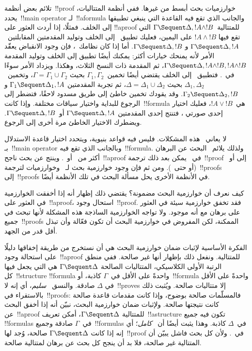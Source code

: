 \documentclass[../../../include/open-logic-section]{subfiles}
\begin{document}
تلائم بعض أنظمة~!!{proof} خوارزميات بحث أبسط من غيرها. ففي أنظمة
المتتاليات، يحدد~!!{main operator} لـ~!!a{formula} والجانب الذي تقع فيه
القاعدة التي ينبغي تطبيقها إلى الخلف. فمثلًا، إذا أردت العثور على
!!a{proof} للمتتالية~$\Gamma \Sequent \Delta,!A\land !B$ التي تقع فيها
$!A\land !B$ على اليمين، فعليك تطبيق~\RightR{\land} إلى الخلف وتوليد
المقدمتين المقابلتين~$\Gamma \Sequent \Delta,!A$ و
$\Gamma \Sequent \Delta,!B$. أما إذا كان نظامك~، فإن وجود
الانقباض يعقّد الأمر لأنه يمنحك خيارات أكثر: يمكنك أيضًا تطبيق
\RightR{\Contraction} إلى الخلف وتوليد المقدمة
$\Gamma \Sequent \Delta,!A\land !B,!A\land !B$، ثم المقدمة ذات النسخ
الثلاث، وهكذا. ويزداد الأمر سوءًا في~. فتطبيق~\RightR{\land} إلى
الخلف يقتضي أيضًا تخمين~$\Gamma_1,\Gamma_2$ بحيث
$\Gamma=\Gamma_1\cup\Gamma_2$، وتخمين~$\Delta_1,\Delta_2$ بحيث
$\Delta=\Delta_1\cup\Delta_2$، ثم تجربة المقدمتين
$\Gamma_1\Sequent\Delta_1,!A$ و$\Gamma_2\Sequent\Delta_2,!B$. وقد يقودك
تخمين خاطئ إلى طريق مسدود لاحقًا، فتضطر إلى الرجوع للبداية واختيار سياقات
مختلفة. وإذا كانت~!!{formula} هي~$!A\lor !B$، فعليك اختيار إحدى صورتي
\RightR{\lor}، فتنتج إحدى المقدمتين
$\Gamma\Sequent\Delta,!A$ أو~$\Gamma\Sequent\Delta,!B$. ويضطرك الاختيار
الخاطئ مرة أخرى إلى الرجوع.

لا يعاني~ هذه المشكلات. فليس فيه قواعد بنيوية، ويتحدد اختيار قاعدة
الاستدلال بـ~!!{main operator} وبالجانب الذي تقع فيه~!!{formula}. ولذلك
يلائم~ البحث عن البرهان أكثر من~ أو~. وينتج عن
بحث ناجح~!!a{proof} في~ يمكن بعد ذلك ترجمة~!!{proof} إلى
 أو~ (أو حتى~). ومن ثم فإن وجود خوارزمية بحث
لـ~ وخوارزميات لترجمة~!!{proof}s~ إلى~!!{proof}s في
الأنظمة الأخرى يحل مسألة البحث في تلك الأنظمة أيضًا.

كيف نعرف أن خوارزمية البحث مضمونة؟ يقتضي ذلك إظهار أنه إذا أخفقت الخوارزمية
في العثور على~!!a{proof}، استحال وجود~!!{proof}. فقد تخفق خوارزمية سيئة في
العثور على برهان مع أنه موجود. ولا تواجه الخوارزمية الساذجة هذه المشكلة
لأنها تبحث في جميع~!!{proof}s الممكنة، لكن المفروض في خوارزمية البحث أن
تكون فعّالة وأن تبذل أقل قدر من الجهد.

الفكرة الأساسية لإثبات ضمان خوارزمية البحث هي أن نستخرج من طريقة إخفاقها
دليلًا على استحالة وجود~!!a{proof} للمتتالية. ونفعل ذلك بإظهار أنها غير
صالحة. ففي منطق الرتبة الأولى الكلاسيكي، المتتاليات الصالحة
$\Gamma\Sequent\Delta$ هي التي يجعل فيها كل~!!{structure} !!{formula}
واحدةً على الأقل في~$\Gamma$ كاذبة، أو~!!{formula} واحدةً على الأقل في
$\Delta$ صادقة. والنسق~ \emph{سليم}، أي إنه لا~!!{prove}s إلا
متتاليات صالحة. ويُثبت ذلك بالاستقراء في~!!{proof}s: فالمسلّمات صالحة
بوضوح، وإذا كانت مقدمات قاعدة صالحة كانت نتيجتها صالحة. ولإثبات ضمان
خوارزمية البحث، نبيّن أنه إذا أخفق البحث عن~!!a{proof} للمتتالية
$\Gamma\Sequent\Delta$، أمكن تعريف~!!a{structure} تكون فيه جميع
!!{formula}s في~$\Gamma$ صادقة وجميع~!!{formula}s في~$\Delta$ كاذبة. وهذا
يثبت أيضًا أن~ \emph{كامل}؛ أي إنه إذا كانت
$\Gamma\Sequent\Delta$ صالحة، وُجد لها~!!{proof} في~. ولأن كل
بحث فاشل يبيّن أن المتتالية غير صالحة، فلا بد أن ينجح كل بحث عن برهان
لمتتالية صالحة.
\end{document}
